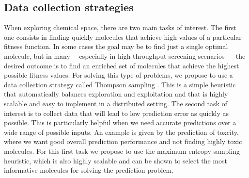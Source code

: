 \subsection{Data collection strategies}

When exploring chemical space, there are two main tasks of interest. The first one consists in finding quickly molecules that achieve high values of a particular fitness function. In some cases the goal may be to find just a single optimal molecule, but in many ---especially in high-throughput screening scenarios \cite{Pyzer_Knapp_2015a}--- the desired outcome is to find 
an enriched set of molecules that achieve the highest possible fitness values. For solving this type of problems, we propose to use a data collection strategy called Thompson sampling \cite{Thompson_1933}. This is a simple heuristic that automatically balances exploration and exploitation \cite{Chapelle2011} and that is highly scalable and easy to implement in a distributed setting.
The second task of interest is to collect data that will lead to low prediction error as quickly as possible. This is particularly helpful when we need accurate predictions over a wide range of possible inputs. An example is given by the prediction of toxcity, where we want good overall prediction performance and not finding highly toxic molecules. For this first task we propose to use the maximum entropy sampling heuristic, which is also highly scalable and can be shown to select the most informative molecules for solving the prediction problem.